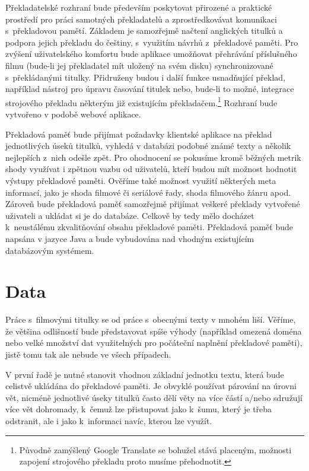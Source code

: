 Překladatelské rozhraní bude především poskytovat přirozené a praktické prostředí pro práci samotných překladatelů a zprostředkovávat komunikaci s~překladovou pamětí. Základem je samozřejmě načtení anglických titulků a podpora jejich překladu do češtiny, s~využitím návrhů z~překladové paměti. Pro zvýšení uživatelského komfortu bude aplikace umožňovat přehrávání příslušného filmu (bude-li jej překladatel mít uložený na svém disku) synchronizované s~pře\-klá\-da\-ný\-mi titulky. Přidruženy budou i další funkce usnadňující překlad, například nástroj pro úpravu časování titulek nebo, bude-li to možné, integrace strojového překladu některým již existujícím překladačem.\footnote{Původně zamýšlený Google Translate se bohužel stává placeným, možnosti zapojení strojového překladu proto musíme přehodnotit.} Rozhraní bude vytvořeno v podobě webové aplikace.


Překladová paměť bude přijímat požadavky klientské aplikace na překlad jednotlivých úseků titulků, vyhledá v databázi podobné známé texty a několik nejlepších z~nich odešle zpět. Pro ohodnocení se pokusíme kromě běžných metrik shody využívat i zpětnou vazbu od uživatelů, kteří budou mít možnost hodnotit výstupy překladové paměti. Ověříme také možnost využití některých meta informací, jako je shoda filmové či seriálové řady, shoda filmového žánru apod. Zároveň bude překladová paměť samozřejmě přijímat veškeré překlady vytvořené uživateli a ukládat si je do databáze. Celkově by tedy mělo docházet k~neustálému zkvalitňování obsahu překladové paměti. Překladová paměť bude napsána v jazyce Java a bude vybudována nad vhodným existujícím databázovým systémem.

\section{Data}
Práce s~filmovými titulky se od práce s~obecnými texty v mnohém liší. Věříme, že většina odlišností bude představovat spíše výhody (například omezená doména nebo velké množství dat využitelných pro počáteční naplnění překladové paměti), jistě tomu tak ale nebude ve všech případech.

V první řadě je nutné stanovit vhodnou základní jednotku textu, která bude celistvě ukládána do překladové paměti. Je obvyklé používat párování na úrovni vět, nicméně jednotlivé úseky titulků často dělí věty na více částí a/nebo sdružují více vět dohromady, k~čemuž lze přistupovat jako k~šumu, který je třeba odstranit, ale i jako k~informaci navíc, kterou lze využít.

